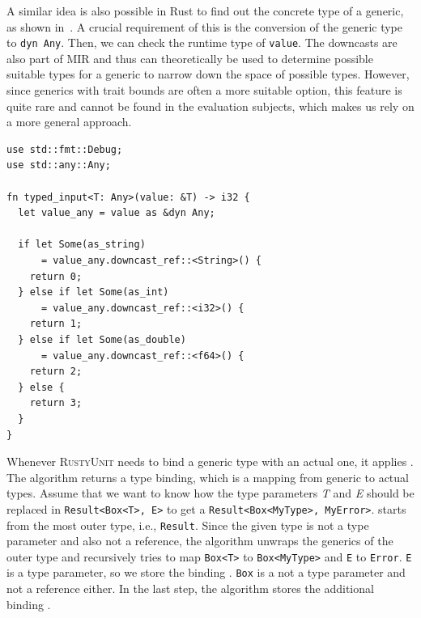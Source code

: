 \documentclass[paper=a4,%
  twoside,%
  BCOR4mm,%
  abstract=true,%
  toc=bibliography,%
  chapterprefix=true,%
  toc=bibliographynumbered,%
  open=right,%
  english,%
  pagesize=pdftex]{scrreprt}
\newcommand{\tech}{\textsc{RustyUnit}\xspace}
\begin{document}
A similar idea is also possible in Rust to find out the concrete type of a generic, as shown in~. A crucial requirement of this is the conversion of the generic type to \texttt{dyn Any}. Then, we can check the runtime type of \texttt{value}. The downcasts are also part of MIR and thus can theoretically be used to determine possible suitable types for a generic to narrow down the space of possible types. However, since generics with trait bounds are often a more suitable option, this feature is quite rare and cannot be found in the evaluation subjects, which makes us rely on a more general approach. 

\begin{lstlisting}[style=boxed, caption={The execution path of the generic Rust function depends on the concrete type of the argument}, label=lst:rust-runtime-reflection]
use std::fmt::Debug;
use std::any::Any;

fn typed_input<T: Any>(value: &T) -> i32 {
  let value_any = value as &dyn Any;

  if let Some(as_string)
      = value_any.downcast_ref::<String>() {
    return 0;
  } else if let Some(as_int)
      = value_any.downcast_ref::<i32>() {
    return 1;
  } else if let Some(as_double)
      = value_any.downcast_ref::<f64>() {
    return 2;
  } else {
    return 3;
  }
}
\end{lstlisting}

Whenever \tech needs to bind a generic type with an actual one, it applies . The algorithm returns a type binding, which is a mapping from generic to actual types. Assume that we want to know how the type parameters \emph{T} and \emph{E} should be replaced in \texttt{Result<Box<T>, E>} to get a \texttt{Result<Box<MyType>, MyError>}.  starts from the most outer type, i.e., \texttt{Result}. Since the given type is not a type parameter and also not a reference, the algorithm unwraps the generics of the outer type and recursively tries to map \texttt{Box<T>} to \texttt{Box<MyType>} and \texttt{E} to \texttt{Error}. \texttt{E} is a type parameter, so we store the binding \texttt{}. \texttt{Box} is a not a type parameter and not a reference either. In the last step, the algorithm stores the additional binding \texttt{}.
\end{document}
